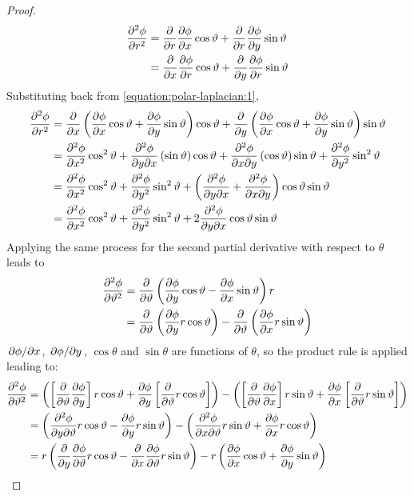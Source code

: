 \begin{lemma}
\begin{proof}
\begin{align*}
            \pdv[2]{\phi}{r}&=\pdv{r}\pdv{\phi}{x}\cos\vartheta+\pdv{r}\pdv{\phi}{y}\sin\vartheta\\
            &=\pdv{x}\pdv{\phi}{r}\cos\vartheta+\pdv{y}\pdv{\phi}{r}\sin\vartheta
        \end{align*}
        Substituting back from \eqref{equation:polar-laplacian:1},
        \begin{align*}
            \pdv[2]{\phi}{r}&=\pdv{x}\left(\pdv{\phi}{x}\cos\vartheta+\pdv{\phi}{y}\sin\vartheta\right)\cos\vartheta+\pdv{y}\left(\pdv{\phi}{x}\cos\vartheta+\pdv{\phi}{y}\sin\vartheta\right)\sin\vartheta\\
            &=\pdv[2]{\phi}{x}\cos^2\vartheta+\pdv{\phi}{y}{x}\left(\sin\vartheta\right)\cos\vartheta+\pdv{\phi}{x}{y}\left(\cos\vartheta\right)\sin\vartheta+\pdv[2]{\phi}{y}\sin^2\vartheta\\
            &=\pdv[2]{\phi}{x}\cos^2\vartheta+\pdv[2]{\phi}{y}\sin^2\vartheta+\left(\pdv{\phi}{y}{x}+\pdv{\phi}{x}{y}\right)\cos\vartheta\sin\vartheta\\
            &=\pdv[2]{\phi}{x}\cos^2\vartheta+\pdv[2]{\phi}{y}\sin^2\vartheta+2\pdv{\phi}{y}{x}\cos\vartheta\sin\vartheta
        \end{align*}
        Applying the same process for the second partial derivative with respect to $\theta$ leads to
        \begin{align*}
            \pdv[2]{\phi}{\vartheta}&=\pdv{\vartheta}\left(\pdv{\phi}{y}\cos\vartheta-\pdv{\phi}{x}\sin\vartheta\right)r\\
            &=\pdv{\vartheta}\left(\pdv{\phi}{y}r\cos\vartheta\right)-\pdv{\vartheta}\left(\pdv{\phi}{x}r\sin\vartheta\right)
        \end{align*}
        $\pdv*{\phi}{x}$, $\pdv*{\phi}{y}$, $\cos\theta$ and $\sin\theta$ are functions of $\theta$, so the product rule is applied leading to:
        \begin{align}
            \notag\pdv[2]{\phi}{\theta}&=\left(\left[\pdv{\theta}\pdv{\phi}{y}\right]r\cos\theta+\pdv{\phi}{y}\left[\pdv{\theta}r\cos\theta\right]\right)-\left(\left[\pdv{\theta}\pdv{\phi}{x}\right]r\sin\theta+\pdv{\phi}{x}\left[\pdv{\theta}r\sin\theta\right]\right)\\
            \notag&=\left(\pdv{\phi}{y}{\theta}r\cos\theta-\pdv{\phi}{y}r\sin\theta\right)-\left(\pdv{\phi}{x}{\theta}r\sin\theta+\pdv{\phi}{x}r\cos\theta\right)\\
            \notag&=r\left(\pdv{y}\pdv{\phi}{\theta}r\cos\theta-\pdv{x}\pdv{\phi}{\theta}r\sin\theta\right)-r\left(\pdv{\phi}{x}\cos\theta+\pdv{\phi}{y}\sin\theta\right)\\

\end{align}
\end{proof}
\end{lemma}
